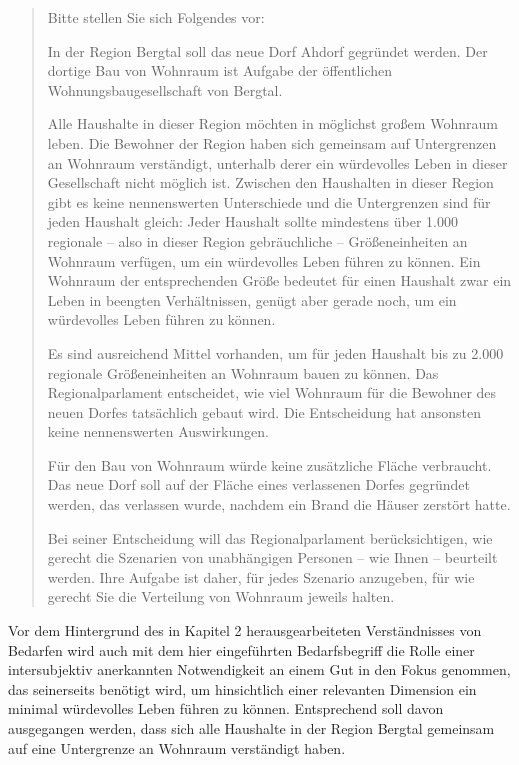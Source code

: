\documentclass[a4paper]{thesis}
\begin{document}
\begin{quote}
Bitte stellen Sie sich Folgendes vor:

In der Region Bergtal soll das neue Dorf Ahdorf gegründet werden. Der dortige Bau von Wohnraum ist Aufgabe der öffentlichen Wohnungsbaugesellschaft von Bergtal.

Alle Haushalte in dieser Region möchten in möglichst großem Wohnraum leben. Die Bewohner der Region haben sich gemeinsam auf Untergrenzen an Wohnraum verständigt, unterhalb derer ein würdevolles Leben in dieser Gesellschaft nicht möglich ist. Zwischen den Haushalten in dieser Region gibt es keine nennenswerten Unterschiede und die Untergrenzen sind für jeden Haushalt gleich: Jeder Haushalt sollte mindestens über 1.000 regionale -- also in dieser Region gebräuchliche -- Größeneinheiten an Wohnraum verfügen, um ein würdevolles Leben führen zu können. Ein Wohnraum der entsprechenden Größe bedeutet für einen Haushalt zwar ein Leben in beengten Verhältnissen, genügt aber gerade noch, um ein würdevolles Leben führen zu können.

Es sind ausreichend Mittel vorhanden, um für jeden Haushalt bis zu 2.000 regionale Größeneinheiten an Wohnraum bauen zu können. Das Regionalparlament entscheidet, wie viel Wohnraum für die Bewohner des neuen Dorfes tatsächlich gebaut wird. Die Entscheidung hat ansonsten keine nennenswerten Auswirkungen.

Für den Bau von Wohnraum würde keine zusätzliche Fläche verbraucht. Das neue Dorf soll auf der Fläche eines verlassenen Dorfes gegründet werden, das verlassen wurde, nachdem ein Brand die Häuser zerstört hatte.

Bei seiner Entscheidung will das Regionalparlament berücksichtigen, wie gerecht die Szenarien von unabhängigen Personen – wie Ihnen – beurteilt werden. Ihre Aufgabe ist daher, für jedes Szenario anzugeben, für wie gerecht Sie die Verteilung von Wohnraum jeweils halten.
\end{quote}

Vor dem Hintergrund des in Kapitel 2 herausgearbeiteten Verständnisses von Bedarfen wird auch mit dem hier eingeführten Bedarfsbegriff die Rolle einer intersubjektiv anerkannten Notwendigkeit an einem Gut in den Fokus genommen, das seinerseits benötigt wird, um hinsichtlich einer relevanten Dimension ein minimal würdevolles Leben führen zu können. Entsprechend soll davon ausgegangen werden, dass sich alle Haushalte in der Region Bergtal gemeinsam auf eine Untergrenze an Wohnraum verständigt haben.
\end{document}

